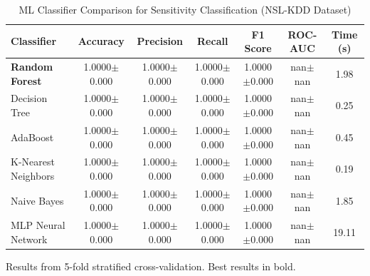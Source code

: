 
\begin{table}[htbp]
\centering
\caption{ML Classifier Comparison for Sensitivity Classification (NSL-KDD Dataset)}
\label{tab:ml_ablation}
\begin{tabular}{lcccccc}
\toprule
\textbf{Classifier} & \textbf{Accuracy} & \textbf{Precision} & \textbf{Recall} & \textbf{F1 Score} & \textbf{ROC-AUC} & \textbf{Time (s)} \\
\midrule
\textbf{Random Forest} & 1.0000$\pm$0.000 & 1.0000$\pm$0.000 & 1.0000$\pm$0.000 & 1.0000$\pm$0.000 & nan$\pm$nan & 1.98 \\
Decision Tree & 1.0000$\pm$0.000 & 1.0000$\pm$0.000 & 1.0000$\pm$0.000 & 1.0000$\pm$0.000 & nan$\pm$nan & 0.25 \\
AdaBoost & 1.0000$\pm$0.000 & 1.0000$\pm$0.000 & 1.0000$\pm$0.000 & 1.0000$\pm$0.000 & nan$\pm$nan & 0.45 \\
K-Nearest Neighbors & 1.0000$\pm$0.000 & 1.0000$\pm$0.000 & 1.0000$\pm$0.000 & 1.0000$\pm$0.000 & nan$\pm$nan & 0.19 \\
Naive Bayes & 1.0000$\pm$0.000 & 1.0000$\pm$0.000 & 1.0000$\pm$0.000 & 1.0000$\pm$0.000 & nan$\pm$nan & 1.85 \\
MLP Neural Network & 1.0000$\pm$0.000 & 1.0000$\pm$0.000 & 1.0000$\pm$0.000 & 1.0000$\pm$0.000 & nan$\pm$nan & 19.11 \\
\bottomrule
\end{tabular}
\begin{tablenotes}
\small
\item Results from 5-fold stratified cross-validation. Best results in bold.
\end{tablenotes}
\end{table}
